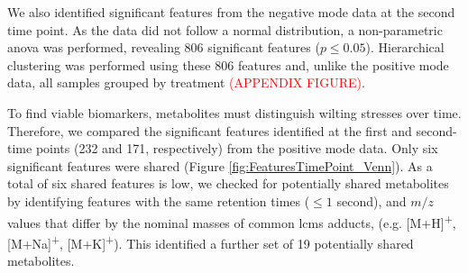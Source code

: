 We also identified significant features from the negative mode data at the second time point. As the data did not follow a normal distribution, a non-parametric \ac{anova} was performed, revealing 806 significant features ($p\le0.05$). Hierarchical clustering was performed using these 806 features and, unlike the positive mode data, all samples grouped by treatment \textcolor{red}{(APPENDIX FIGURE)}. 

\label{section:T1AndT2Adducts}
To find viable biomarkers, metabolites must distinguish wilting stresses over time. Therefore, we compared the significant features identified at the first and second-time points (232 and 171, respectively) from the positive mode data. Only six significant features were shared (Figure \ref{fig:FeaturesTimePoint_Venn}). As a total of six shared features is low, we checked for potentially shared metabolites by identifying features with the same retention times ($\le1$ second), and $m/z$ values that differ by the nominal masses of common \ac{lcms} adducts, (e.g. [M+H]\textsuperscript{+}, [M+Na]\textsuperscript{+}, [M+K]\textsuperscript{+}). This identified a further set of 19 potentially shared metabolites. 

